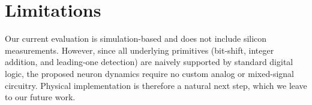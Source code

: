 \begin{table}[htbp]
  \centering
  \scriptsize
  \caption{Accuracy comparison of FlatQuant W4A4 and further PRIME conversion on LLaMA2-7B.}
  \label{tab:flatquant_prime_llama2}
\end{table}

\section{Limitations}
Our current evaluation is simulation-based and does not include silicon measurements. However, since all underlying primitives (bit-shift, integer addition, and leading-one detection) are naively supported by standard digital logic, the proposed neuron dynamics require no custom analog or mixed-signal circuitry. Physical implementation is therefore a natural next step, which we leave to our future work.